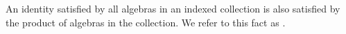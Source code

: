 \begin{code}
\AgdaSymbol{)}\<%
\\
%
\>[2]\AgdaSpace{}%
\AgdaSpace{}%
%
\>[22]\AgdaSpace{}%
\AgdaSymbol{()}\AgdaSpace{}%
\AgdaSpace{}%
\AgdaSymbol{(}\AgdaSpace{}%
\AgdaSpace{}%
\AgdaSpace{}%
\AgdaSpace{}%
\AgdaSymbol{)}\<%
\\
%
\>[2]\AgdaSpace{}%
\AgdaSpace{}%
%
\>[22]\AgdaSpace{}%
\AgdaSymbol{(}\AgdaSpace{}%
\AgdaSpace{}%
\AgdaSymbol{)}\<%
\\
%
\>[2]\AgdaSpace{}%
\AgdaSpace{}%
\AgdaSymbol{=}\AgdaSpace{}%
\AgdaSpace{}%
\AgdaSpace{}%
\AgdaSpace{}%
\AgdaSymbol{;}\AgdaSpace{}%
\AgdaSpace{}%
\AgdaSymbol{=}\AgdaSpace{}%
\AgdaSpace{}%
\AgdaSpace{}%
\AgdaSpace{}%
\<%
\\
\>[0]\<%
\end{code}
\fi
An identity satisfied by all algebras in an indexed collection is
also satisfied by the product of algebras in the collection.
\ifshort
We refer to this fact as .
\else


